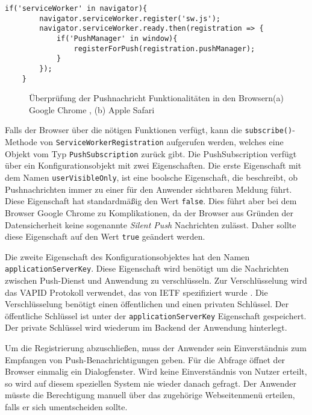 \begin{lstlisting}[caption={Push-Registrierung unter Berücksichtigung der Konzepte von Progressive Enhancement}, label={lst:regPush}, float={!htb}]
    if('serviceWorker' in navigator){
        navigator.serviceWorker.register('sw.js');
        navigator.serviceWorker.ready.then(registration => {
            if('PushManager' in window){
                registerForPush(registration.pushManager);
            }
        });
    }
\end{lstlisting}

\begin{figure}[!htb]
    \centering
    \qquad
    \caption{Überprüfung der Pushnachricht Funktionalitäten in den Browsern(a) Google Chrome  , (b) Apple Safari}
    \label{img:PushManagerBrowser}
\end{figure}

Falls der Browser über die nötigen Funktionen verfügt, kann die \texttt{subscribe()}-Methode von \texttt{ServiceWorkerRegistration} aufgerufen werden, welches eine Objekt vom Typ \texttt{PushSubscription} zurück gibt. 
Die PushSubscription verfügt über ein Konfigurationsobjekt mit zwei Eigenschaften. Die erste Eigenschaft mit dem Namen \texttt{userVisibleOnly}, ist eine boolsche Eigenschaft, die  beschreibt, ob Pushnachrichten immer zu einer für den Anwender sichtbaren Meldung führt. Diese Eigenschaft hat standardmäßig den Wert \texttt{false}. Dies führt aber bei dem Browser Google Chrome zu Komplikationen, da der Browser aus Gründen der Datensicherheit keine sogenannte \textit{Silent Push} Nachrichten zulässt. Daher sollte diese Eigenschaft auf den Wert \texttt{true} geändert werden. 

Die zweite Eigenschaft des Konfigurationsobjektes hat den Namen \texttt{applicationServerKey}. Diese Eigenschaft wird benötigt um die Nachrichten zwischen Push-Dienst und Anwendung zu verschlüsseln. Zur Verschlüsselung wird das \ac{VAPID} Protokoll verwendet, das von IETF spezifiziert wurde \cite{rfc8292}. Die Verschlüsselung benötigt einen öffentlichen und einen privaten Schlüssel. Der öffentliche Schlüssel ist unter der \texttt{applicationServerKey} Eigenschaft gespeichert. Der private Schlüssel wird wiederum im Backend der Anwendung hinterlegt. 

Um die Registrierung abzuschließen, muss der Anwender sein Einverständnis zum Empfangen von Push-Benachrichtigungen geben. Für die Abfrage öffnet der Browser einmalig ein Dialogfenster. Wird keine Einverständnis von Nutzer erteilt, so wird auf diesem speziellen System nie wieder danach gefragt. Der Anwender müsste die Berechtigung manuell über das zugehörige Webseitenmenü erteilen, falls er sich umentscheiden sollte. 

